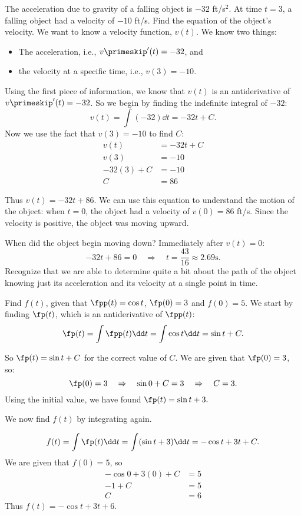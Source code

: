 \begin{example}\label{ex_anti4}%
The acceleration due to gravity of a falling object is $-32$ ft/s$^2$. At time $t=3$, a falling object had a velocity of $-10$ ft/s. Find the equation of the object's velocity.
\solution
We want to know a velocity function, $v(t)$. We know two things:
	\begin{itemize}
		\item		The acceleration, i.e., $v\primeskip'(t)= -32$, and
		\item		the velocity at a specific time, i.e., $v(3) = -10$.
	\end{itemize}
Using the first piece of information, we know that $v(t)$ is an antiderivative of $v\primeskip'(t)=-32$. So we begin by finding the indefinite integral of $-32$:
\[v(t)=\int (-32)\dd t = -32t+C.\]
Now we use the fact that $v(3)=-10$ to find $C$:
\begin{align*}
	v(t) &= -32t+C \\
	v(3) &= -10 \\
	-32(3)+C &= -10\\
	C &= 86
\end{align*}

Thus $v(t)= -32t+86$. We can use this equation to understand the motion of the object: when $t=0$, the object had a velocity of $v(0) = 86$ ft/s. Since the velocity is positive, the object was moving upward.

When did the object begin moving down? Immediately after $v(t) = 0$:
\[-32t+86 = 0 \quad \Rightarrow\quad  t = \frac{43}{16}  \approx 2.69\text{s}.\]
Recognize that we are able to determine quite a bit about the path of the object knowing just its acceleration and its velocity at a single point in time.
\end{example}

\begin{example}\label{ex_anti5}%
Find $f(t)$, given that $\fpp(t) = \cos t$, $\fp(0) = 3$ and $f(0) = 5$.
\solution
We start by finding $\fp(t)$, which is an antiderivative of $\fpp(t)$:
\[\fp(t)=\int \fpp(t)\dd t = \int \cos t\dd t = \sin t + C.\]

So $\fp(t) = \sin t+C$ for the correct value of $C$. We are given that $\fp(0) = 3$, so:
\[\fp(0) = 3 \quad \Rightarrow \quad \sin 0+C = 3 \quad \Rightarrow \quad C=3.\]
Using the initial value, we have found $\fp(t) = \sin t+ 3.$
		
We now find $f(t)$ by integrating again.

\[f(t)=\int \fp(t) \dd t = \int (\sin t+3)\dd t = -\cos t + 3t + C.\]
We are given that $f(0) = 5$, so
\begin{align*}
-\cos 0 + 3(0) + C &= 5 \\
-1 + C &= 5\\
C &= 6
\end{align*}
 Thus $f(t) = -\cos t + 3t + 6$.
\end{example}


